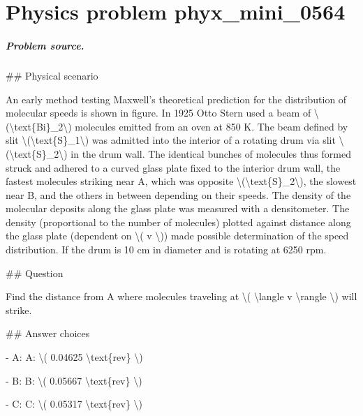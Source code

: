
\chapter{Physics problem phyx\_mini\_0564}
\label{ch:PhyXMiniProblems_problem_phyx_mini_0564}

\paragraph{Problem source.}
\#\# Physical scenario

An early method testing Maxwell's theoretical prediction for the distribution of molecular speeds is shown in figure. In 1925 Otto Stern used a beam of \textbackslash{}(\textbackslash{}text\{Bi\}\_2\textbackslash{}) molecules emitted from an oven at 850 K. The beam defined by slit \textbackslash{}(\textbackslash{}text\{S\}\_1\textbackslash{}) was admitted into the interior of a rotating drum via slit \textbackslash{}(\textbackslash{}text\{S\}\_2\textbackslash{}) in the drum wall. The identical bunches of molecules thus formed struck and adhered to a curved glass plate fixed to the interior drum wall, the fastest molecules striking near A, which was opposite \textbackslash{}(\textbackslash{}text\{S\}\_2\textbackslash{}), the slowest near B, and the others in between depending on their speeds. The density of the molecular deposits along the glass plate was measured with a densitometer. The density (proportional to the number of molecules) plotted against distance along the glass plate (dependent on \textbackslash{}( v \textbackslash{})) made possible determination of the speed distribution. If the drum is 10 cm in diameter and is rotating at 6250 rpm.

\#\# Question

Find the distance from A where molecules traveling at \textbackslash{}( \textbackslash{}langle v \textbackslash{}rangle \textbackslash{}) will strike.

\#\# Answer choices

- A: A: \textbackslash{}( 0.04625 \textbackslash{}text\{rev\} \textbackslash{})

- B: B: \textbackslash{}( 0.05667 \textbackslash{}text\{rev\} \textbackslash{})

- C: C: \textbackslash{}( 0.05317 \textbackslash{}text\{rev\} \textbackslash{})

